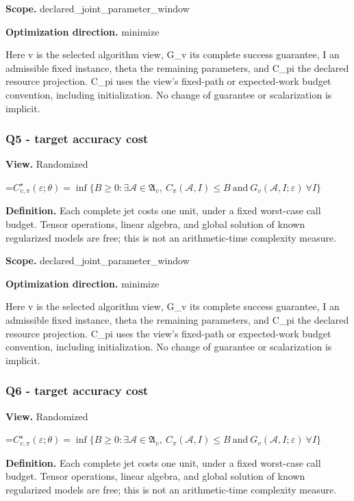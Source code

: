 \documentclass[10pt,a4paper]{article}
\newcommand{\AtlasMath}[1]{\par\begingroup\centering\setbox0=\hbox{$\displaystyle #1$}\ifdim\wd0>1.4\linewidth\typeout{ATLAS WIDE FORMULA: \the\wd0}\fi\ifdim\wd0>\linewidth\resizebox{\linewidth}{!}{\box0}\else\box0\fi\par\endgroup}
\begin{document}
\textbf{Scope.} declared\_\allowbreak{}joint\_\allowbreak{}parameter\_\allowbreak{}window

\textbf{Optimization direction.} minimize

Here v is the selected algorithm view, G\_\allowbreak{}v its complete success guarantee, I an admissible fixed instance, theta the remaining parameters, and C\_\allowbreak{}pi the declared resource projection. C\_\allowbreak{}pi uses the view's fixed-path or expected-work budget convention, including initialization. No change of guarantee or scalarization is implicit.

\subsubsection{Q5 - target accuracy cost}
\textbf{View.} Randomized

\AtlasMath{C^\star_{v,\pi}(\varepsilon;\theta)=\inf\{B\ge0:\exists\mathcal A\in\mathfrak A_v,\ C_\pi(\mathcal A,I)\le B\ \text{and}\ G_v(\mathcal A,I;\varepsilon)\ \forall I\}}
\textbf{Definition.} Each complete jet costs one unit, under a fixed worst-case call budget. Tensor operations, linear algebra, and global solution of known regularized models are free; this is not an arithmetic-time complexity measure.

\textbf{Scope.} declared\_\allowbreak{}joint\_\allowbreak{}parameter\_\allowbreak{}window

\textbf{Optimization direction.} minimize

Here v is the selected algorithm view, G\_\allowbreak{}v its complete success guarantee, I an admissible fixed instance, theta the remaining parameters, and C\_\allowbreak{}pi the declared resource projection. C\_\allowbreak{}pi uses the view's fixed-path or expected-work budget convention, including initialization. No change of guarantee or scalarization is implicit.

\subsubsection{Q6 - target accuracy cost}
\textbf{View.} Randomized

\AtlasMath{C^\star_{v,\pi}(\varepsilon;\theta)=\inf\{B\ge0:\exists\mathcal A\in\mathfrak A_v,\ C_\pi(\mathcal A,I)\le B\ \text{and}\ G_v(\mathcal A,I;\varepsilon)\ \forall I\}}
\textbf{Definition.} Each complete jet costs one unit, under a fixed worst-case call budget. Tensor operations, linear algebra, and global solution of known regularized models are free; this is not an arithmetic-time complexity measure.
\end{document}
